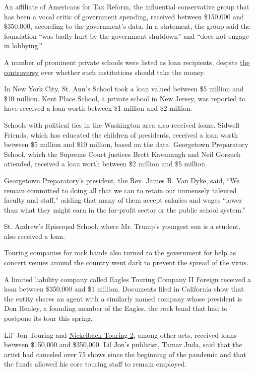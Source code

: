 An affiliate of Americans for Tax Reform, the influential conservative
group that has been a vocal critic of government spending, received
between \$150,000 and \$350,000, according to the government's data. In
a statement, the group said the foundation ``was badly hurt by the
government shutdown'' and ``does not engage in lobbying.''

A number of prominent private schools were listed as loan recipients,
despite
\href{https://www.nytimes.com/2020/04/29/us/prep-schools-coronavirus-loans.html}{the
controversy} over whether such institutions should take the money.

In New York City, St. Ann's School took a loan valued between \$5
million and \$10 million. Kent Place School, a private school in New
Jersey, was reported to have received a loan worth between \$1 million
and \$2 million.

Schools with political ties in the Washington area also received loans.
Sidwell Friends, which has educated the children of presidents, received
a loan worth between \$5 million and \$10 million, based on the data.
Georgetown Preparatory School, which the Supreme Court justices Brett
Kavanaugh and Neil Gorsuch attended, received a loan worth between \$2
million and \$5 million.

Georgetown Preparatory's president, the Rev. James R. Van Dyke, said,
``We remain committed to doing all that we can to retain our immensely
talented faculty and staff,'' adding that many of them accept salaries
and wages ``lower than what they might earn in the for-profit sector or
the public school system.''

St. Andrew's Episcopal School, where Mr. Trump's youngest son is a
student, also received a loan.

Touring companies for rock bands also turned to the government for help
as concert venues around the country went dark to prevent the spread of
the virus.

A limited liability company called Eagles Touring Company II Foreign
received a loan between \$350,000 and \$1 million. Documents filed in
California show that the entity shares an agent with a similarly named
company whose president is Don Henley, a founding member of the Eagles,
the rock band that had to postpone its tour this spring.

Lil' Jon Touring and
\href{https://slack-redir.net/link?url=https\%3A\%2F\%2Fbusinesssearch.sos.ca.gov\%2FDocument\%2FRetrievePDF\%3FId\%3D02813188-11505402}{Nickelback
Touring 2}, among other acts, received loans between \$150,000 and
\$350,000. Lil Jon's publicist, Tamar Juda, said that the artist had
canceled over 75 shows since the beginning of the pandemic and that the
funds allowed his core touring staff to remain employed.

